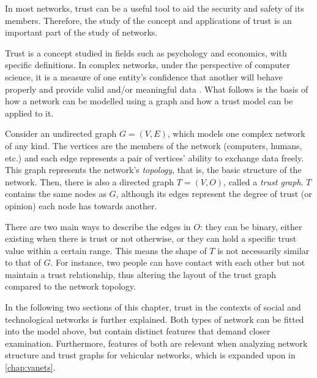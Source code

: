 
In most networks, trust can be a useful tool to aid the security and safety of its members.
Therefore, the study of the concept and applications of trust is an important part of the study of networks. 

Trust is a concept studied in fields such as psychology and economics, with specific definitions.
In complex networks, under the perspective of computer science, it is a measure of one entity's confidence that another will behave properly and provide valid and/or meaningful data \cite{sherchan2013survey}.
What follows is the basis of how a network can be modelled using a graph and how a trust model can be applied to it.

Consider an undirected graph $G = (V,E)$, which models one complex network of any kind.
The vertices are the members of the network (computers, humans, etc.) and each edge represents a pair of vertices' ability to exchange data freely.
This graph represents the network's \textit{topology}, that is, the basic structure of the network.
Then, there is also a directed graph $T = (V, O)$, called a \textit{trust graph}.
$T$ contains the same nodes as $G$, although its edges represent the degree of trust (or opinion) each node has towards another.

There are two main ways to describe the edges in $O$: they can be binary, either existing when there is trust or not otherwise, or they can hold a specific trust value within a certain range.
This means the shape of $T$ is not necessarily similar to that of $G$.
For instance, two people can have contact with each other but not maintain a trust relationship, thus altering the layout of the trust graph compared to the network topology.

In the following two sections of this chapter, trust in the contexts of social and technological networks is further explained.
Both types of network can be fitted into the model above, but contain distinct features that demand closer examination.
Furthermore, features of both are relevant when analyzing network structure and trust graphs for vehicular networks, which is expanded upon in \autoref{chap:vanets}.

